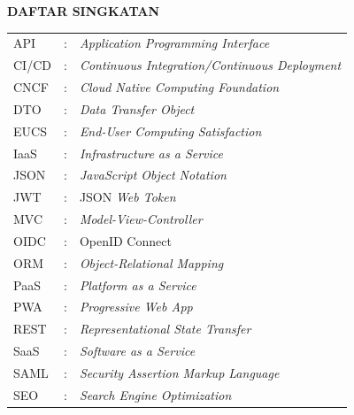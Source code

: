 \clearpage
{}
{}

\begin{center}
	\large \textbf{DAFTAR SINGKATAN}
\end{center}
\vspace{1em}

\begin{center}
	\begin{table}[htbp]
		\begin{tabular}{l l l}
			API   & : & \textit{Application Programming Interface}            \\ %
			CI/CD & : & \textit{Continuous Integration/Continuous Deployment} \\ %
			CNCF  & : & \textit{Cloud Native Computing Foundation}            \\ %
			DTO   & : & \textit{Data Transfer Object}                         \\ %
			EUCS  & : & \textit{End-User Computing Satisfaction}              \\ %
			IaaS  & : & \textit{Infrastructure as a Service}                  \\ %
			JSON  & : & \textit{JavaScript Object Notation}                   \\ %
			JWT   & : & JSON \textit{Web Token}                               \\ %
			MVC   & : & \textit{Model-View-Controller}                        \\ %
			OIDC  & : & OpenID Connect                                        \\ %
			ORM   & : & \textit{Object-Relational Mapping}                    \\ %
			PaaS  & : & \textit{Platform as a Service}                        \\ %
			PWA   & : & \textit{Progressive Web App}                          \\ %
			REST  & : & \textit{Representational State Transfer}              \\ %
			SaaS  & : & \textit{Software as a Service}                        \\ %
			SAML  & : & \textit{Security Assertion Markup Language}           \\ %
			SEO   & : & \textit{Search Engine Optimization}                   \\ %

\end{tabular}
\end{table}
\end{center}
